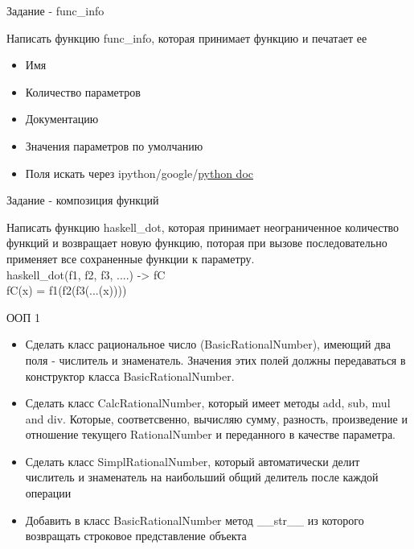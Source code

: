 \documentclass{article}
\begin{document}
\begin{center} Задание - func\_info \end{center}
    Написать функцию func\_info, которая принимает функцию и печатает ее
    \begin{itemize}
        \item Имя
        \item Количество параметров
        \item Документацию
        \item Значения параметров по умолчанию
        \item Поля искать через ipython/google/\href{http://docs.python.org/reference/datamodel.html}{python doc}
    \end{itemize}
\newpage
\begin{center}Задание - композиция функций\end{center}
    Написать функцию haskell\_dot, которая принимает неограниченное количество функций
    и возвращает новую функцию, поторая при вызове последовательно применяет все 
    сохраненные функции к параметру. \\

    haskell\_dot(f1, f2, f3, ....) -> fC \\
    fC(x) = f1(f2(f3(...(x))))
\newpage

\begin{center} ООП 1 \end{center}
\begin{itemize}
    \item Сделать класс рациональное число (BasicRationalNumber),
        имеющий два поля - числитель и знаменатель. Значения этих полей 
        должны передаваться в конструктор класса BasicRationalNumber.
    \item Сделать класс CalcRationalNumber, который имеет методы add,
        sub, mul and div. Которые, соответсвенно, вычисляю сумму, разность,
        произведение и отношение текущего RationalNumber и переданного в качестве 
        параметра.
    \item Сделать класс SimplRationalNumber, который автоматически делит
        числитель и знаменатель на наибольший общий делитель после каждой операции
    \item Добавить в класс BasicRationalNumber метод \_\_str\_\_ из которого возвращать
        строковое представление объекта
\end{itemize}
\end{document}
